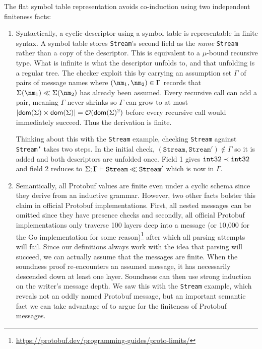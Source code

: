The flat symbol table representation avoids co-induction using two independent
finiteness facts:
\begin{enumerate}
\item Syntactically, a cyclic descriptor using a symbol table is representable
  in finite syntax. A symbol table stores \texttt{Stream}'s second field as the
  \emph{name} \texttt{Stream} rather than a copy of the descriptor. This is
  equivalent to a $\mu$-bound recursive type. What is infinite is what the
  descriptor unfolds to, and that unfolding is a regular tree. The checker
  exploit this by carrying an assumption set $\Gamma$ of pairs of message names where
  $(\nm_1, \nm_2) \in \Gamma$ records that
  $\Sigma(\nm_1) \dcompat \Sigma(\nm_2)$ has already been assumed. Every recursive call
  can add a pair, meaning $\Gamma$ never shrinks so $\Gamma$ can grow to at most
  $|\mathsf{dom}(\Sigma) \times \mathsf{dom}(\Sigma)| = \mathcal{O}(\mathsf{dom}(\Sigma)^2)$ before every recursive call would
  immediately succeed. Thus the derivation is finite.

  Thinking about this with the \texttt{Stream} example, checking \texttt{Stream}
  against \texttt{Stream'} takes two steps. In the initial check,
  $(\mathtt{Stream}, \mathtt{Stream'}) \not \in \Gamma$ so it is added and both
  descriptors are unfolded once. Field 1 gives $\texttt{int32} \prec \texttt{int32}$ and field 2
  reduces to $\Sigma; \Gamma \vdash \mathtt{Stream} \ll \mathtt{Stream'}$ which is now
  in $\Gamma$.
\item Semantically, all Protobuf values are finite even under a cyclic schema
  since they derive from an inductive grammar. However, two other facts bolster
  this claim in official Protobuf implementations. First, all nested messages
  can be omitted since they have presence checks and secondly, all official
  Protobuf implementations only traverse 100 layers deep into a message (or
  10,000 for the Go implementation for some
  reason)\footnote{\url{https://protobuf.dev/programming-guides/proto-limits/}}
  after which all parsing attempts will fail. Since our definitions always work
  with the idea that parsing will succeed, we can actually assume that the
  messages are finite. When the soundness proof re-encounters an assumed
  message, it has necessarily descended down at least one layer. Soundness can
  then use strong induction on the writer's message depth. We saw this with the
  \texttt{Stream} example, which reveals not an oddly named Protobuf message,
  but an important semantic fact we can take advantage of to argue for the
  finiteness of Protobuf messages.
\end{enumerate}

